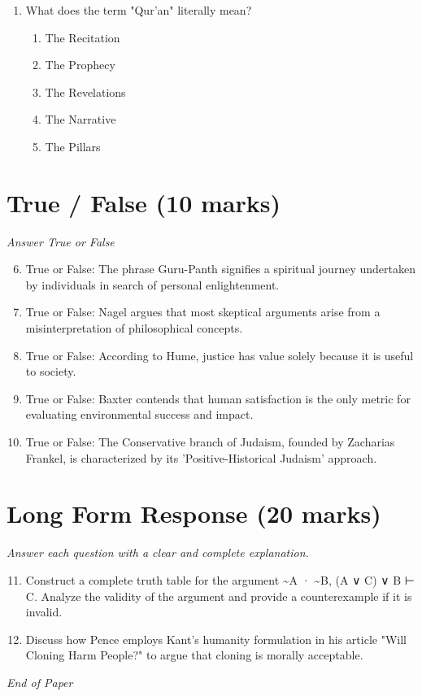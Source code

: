 \documentclass[12pt]{article}
\begin{document}
\begin{enumerate}[label=\arabic*.]
\begin{enumerate}[label=(\alph*)]
    \item False sign
    \item False cause
    \item Hasty Generalization
\end{enumerate}
\item What does the term "Qur'an" literally mean?
\begin{enumerate}[label=(\alph*)]
    \item The Recitation
    \item The Prophecy
    \item The Revelations
    \item The Narrative
    \item The Pillars
\end{enumerate}
\end{enumerate}

\section*{True / False (10 marks)}
\textit{Answer True or False}
\begin{enumerate}[label=\arabic*.]
\setcounter{enumi}{5}
\item True or False: The phrase Guru-Panth signifies a spiritual journey undertaken by individuals in search of personal enlightenment.
\item True or False: Nagel argues that most skeptical arguments arise from a misinterpretation of philosophical concepts.
\item True or False: According to Hume, justice has value solely because it is useful to society.
\item True or False: Baxter contends that human satisfaction is the only metric for evaluating environmental success and impact.
\item True or False: The Conservative branch of Judaism, founded by Zacharias Frankel, is characterized by its 'Positive-Historical Judaism' approach.
\end{enumerate}

\section*{Long Form Response (20 marks)}
\textit{Answer each question with a clear and complete explanation.}
\begin{enumerate}[label=\arabic*.]
\setcounter{enumi}{10}
\item Construct a complete truth table for the argument \textasciitilde{}A · \textasciitilde{}B, (A ∨ C) ∨ B ⊢ C. Analyze the validity of the argument and provide a counterexample if it is invalid.
\item Discuss how Pence employs Kant's humanity formulation in his article "Will Cloning Harm People?" to argue that cloning is morally acceptable.
\end{enumerate}

\vfill
\noindent\textit{End of Paper}
\end{document}
